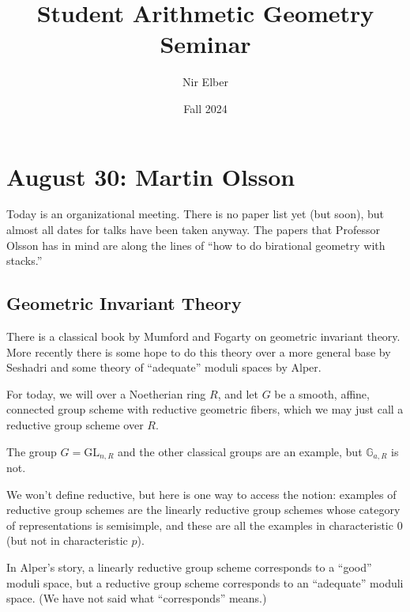 \documentclass{article}
\title{Student Arithmetic Geometry Seminar}
\author{Nir Elber}
\date{Fall 2024}
\begin{document}
\maketitle

\tableofcontents

\section{August 30: Martin Olsson}
Today is an organizational meeting. There is no paper list yet (but soon), but almost all dates for talks have been taken anyway. The papers that Professor Olsson has in mind are along the lines of ``how to do birational geometry with stacks.''

\subsection{Geometric Invariant Theory}
There is a classical book by Mumford and Fogarty on geometric invariant theory. More recently there is some hope to do this theory over a more general base by Seshadri and some theory of ``adequate'' moduli spaces by Alper.

For today, we will over a Noetherian ring $R$, and let $G$ be a smooth, affine, connected group scheme with reductive geometric fibers, which we may just call a reductive group scheme over $R$.
\begin{example}
    The group $G=\mathrm{GL}_{n,R}$ and the other classical groups are an example, but $\mathbb G_{a,R}$ is not.
\end{example}
\begin{example}
    We won't define reductive, but here is one way to access the notion: examples of reductive group schemes are the linearly reductive group schemes whose category of representations is semisimple, and these are all the examples in characteristic $0$ (but not in characteristic $p$).
\end{example}
In Alper's story, a linearly reductive group scheme corresponds to a ``good'' moduli space, but a reductive group scheme corresponds to an ``adequate'' moduli space. (We have not said what ``corresponds'' means.)
\end{document}
